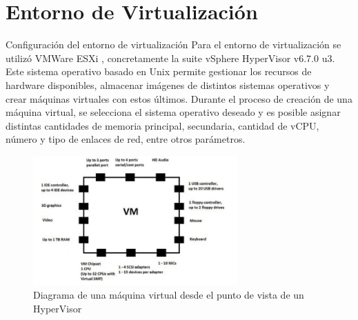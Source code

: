 \appendix
\chapter{\Large Entorno de Virtualización}
    \begin{section}{Configuración del entorno de virtualización}
        Para el entorno de virtualización se utilizó VMWare ESXi \cite{vmware}, concretamente la suite vSphere HyperVisor v6.7.0 u3. Este sistema operativo basado en Unix permite gestionar los recursos de hardware disponibles, almacenar imágenes de distintos sistemas operativos y crear máquinas virtuales con estos últimos. Durante el proceso de creación de una máquina virtual, se selecciona el sistema operativo deseado y es posible asignar distintas cantidades de memoria principal, secundaria, cantidad de vCPU, número y tipo de enlaces de red, entre otros parámetros. \par
         \begin{figure}[H]
          \centering
           \includegraphics[width=0.7\textwidth]{./iteracion_1_imagenes/figura_34_diagrama_VM.png}
            \caption{ Diagrama de una máquina virtual desde el punto de vista de un HyperVisor\cite{vmware}}
            \label{fig:maquina_virtual}
        \end{figure}
        \end{section}
        
